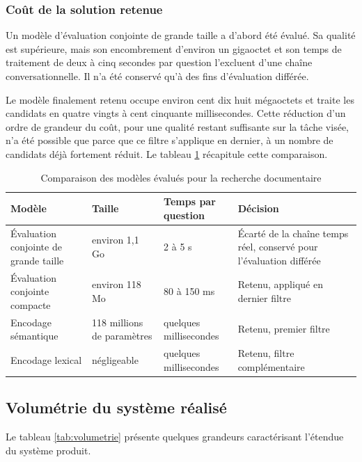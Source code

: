 \subsubsection{Coût de la solution retenue}

Un modèle d'évaluation conjointe de grande taille a d'abord été évalué. Sa qualité est supérieure, mais son encombrement d'environ un gigaoctet et son temps de traitement de deux à cinq secondes par question l'excluent d'une chaîne conversationnelle. Il n'a été conservé qu'à des fins d'évaluation différée.

Le modèle finalement retenu occupe environ cent dix huit mégaoctets et traite les candidats en quatre vingts à cent cinquante millisecondes. Cette réduction d'un ordre de grandeur du coût, pour une qualité restant suffisante sur la tâche visée, n'a été possible que parce que ce filtre s'applique en dernier, à un nombre de candidats déjà fortement réduit. Le tableau \ref{tab:rag-modeles} récapitule cette comparaison.

\begin{table}[H]
\centering
\renewcommand{\arraystretch}{1.25}
\begin{tabular}{|p{4.6cm}|p{2.4cm}|p{3.2cm}|p{4.0cm}|}
\hline
\textbf{Modèle} & \textbf{Taille} & \textbf{Temps par question} & \textbf{Décision} \\
\hline
Évaluation conjointe de grande taille & environ 1,1 Go & 2 à 5 s & Écarté de la chaîne temps réel, conservé pour l'évaluation différée \\
\hline
Évaluation conjointe compacte & environ 118 Mo & 80 à 150 ms & Retenu, appliqué en dernier filtre \\
\hline
Encodage sémantique & 118 millions de paramètres & quelques millisecondes & Retenu, premier filtre \\
\hline
Encodage lexical & négligeable & quelques millisecondes & Retenu, filtre complémentaire \\
\hline
\end{tabular}
\caption{Comparaison des modèles évalués pour la recherche documentaire}
\label{tab:rag-modeles}
\end{table}

\subsection{Volumétrie du système réalisé}

Le tableau \ref{tab:volumetrie} présente quelques grandeurs caractérisant l'étendue du système produit.

